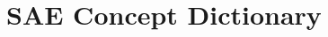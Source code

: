 \begin{longtable}{@{}>{\ttfamily}p{\linewidth}@{}}
    \bottomrule
\end{longtable}

\normalsize

\section*{SAE Concept Dictionary}

\footnotesize

